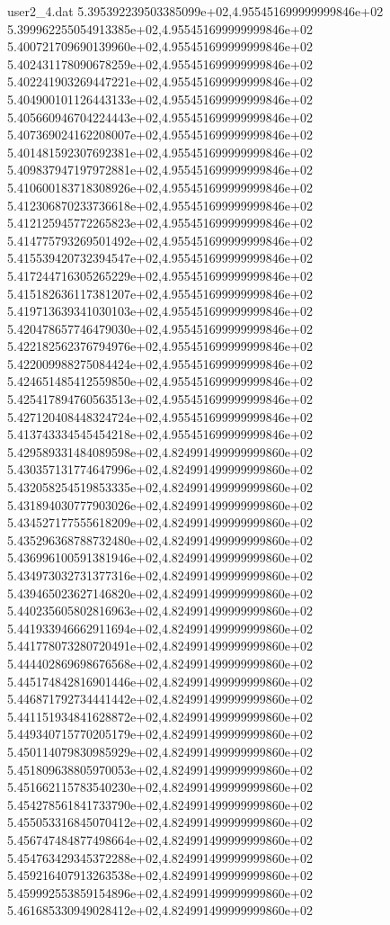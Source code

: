 \begin{filecontents}{user2_4.dat}
5.395392239503385099e+02,4.955451699999999846e+02
5.399962255054913385e+02,4.955451699999999846e+02
5.400721709690139960e+02,4.955451699999999846e+02
5.402431178090678259e+02,4.955451699999999846e+02
5.402241903269447221e+02,4.955451699999999846e+02
5.404900101126443133e+02,4.955451699999999846e+02
5.405660946704224443e+02,4.955451699999999846e+02
5.407369024162208007e+02,4.955451699999999846e+02
5.401481592307692381e+02,4.955451699999999846e+02
5.409837947197972881e+02,4.955451699999999846e+02
5.410600183718308926e+02,4.955451699999999846e+02
5.412306870233736618e+02,4.955451699999999846e+02
5.412125945772265823e+02,4.955451699999999846e+02
5.414775793269501492e+02,4.955451699999999846e+02
5.415539420732394547e+02,4.955451699999999846e+02
5.417244716305265229e+02,4.955451699999999846e+02
5.415182636117381207e+02,4.955451699999999846e+02
5.419713639341030103e+02,4.955451699999999846e+02
5.420478657746479030e+02,4.955451699999999846e+02
5.422182562376794976e+02,4.955451699999999846e+02
5.422009988275084424e+02,4.955451699999999846e+02
5.424651485412559850e+02,4.955451699999999846e+02
5.425417894760563513e+02,4.955451699999999846e+02
5.427120408448324724e+02,4.955451699999999846e+02
5.413743334545454218e+02,4.955451699999999846e+02
5.429589331484089598e+02,4.824991499999999860e+02
5.430357131774647996e+02,4.824991499999999860e+02
5.432058254519853335e+02,4.824991499999999860e+02
5.431894030777903026e+02,4.824991499999999860e+02
5.434527177555618209e+02,4.824991499999999860e+02
5.435296368788732480e+02,4.824991499999999860e+02
5.436996100591381946e+02,4.824991499999999860e+02
5.434973032731377316e+02,4.824991499999999860e+02
5.439465023627146820e+02,4.824991499999999860e+02
5.440235605802816963e+02,4.824991499999999860e+02
5.441933946662911694e+02,4.824991499999999860e+02
5.441778073280720491e+02,4.824991499999999860e+02
5.444402869698676568e+02,4.824991499999999860e+02
5.445174842816901446e+02,4.824991499999999860e+02
5.446871792734441442e+02,4.824991499999999860e+02
5.441151934841628872e+02,4.824991499999999860e+02
5.449340715770205179e+02,4.824991499999999860e+02
5.450114079830985929e+02,4.824991499999999860e+02
5.451809638805970053e+02,4.824991499999999860e+02
5.451662115783540230e+02,4.824991499999999860e+02
5.454278561841733790e+02,4.824991499999999860e+02
5.455053316845070412e+02,4.824991499999999860e+02
5.456747484877498664e+02,4.824991499999999860e+02
5.454763429345372288e+02,4.824991499999999860e+02
5.459216407913263538e+02,4.824991499999999860e+02
5.459992553859154896e+02,4.824991499999999860e+02
5.461685330949028412e+02,4.824991499999999860e+02

\end{filecontents}

